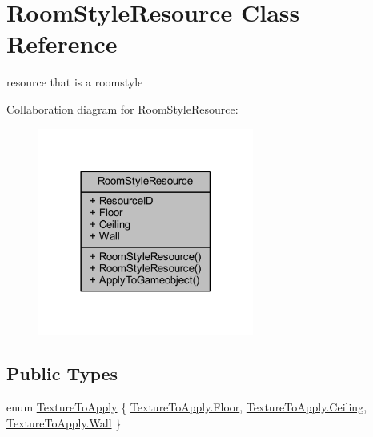 \hypertarget{class_room_style_resource}{}\section{Room\+Style\+Resource Class Reference}
\label{class_room_style_resource}


resource that is a roomstyle  




Collaboration diagram for Room\+Style\+Resource\+:
\nopagebreak
\begin{figure}[H]
\begin{center}
\leavevmode
\includegraphics[width=201pt]{class_room_style_resource__coll__graph}
\end{center}
\end{figure}
\subsection*{Public Types}
\begin{DoxyCompactItemize}
\item 
enum \mbox{\hyperlink{class_room_style_resource_a877062d3830671f8376cc30340cdb45f}{Texture\+To\+Apply}} \{ \mbox{\hyperlink{class_room_style_resource_a877062d3830671f8376cc30340cdb45faf3f6d0343d56ce88ce7958170ed05cb3}{Texture\+To\+Apply.\+Floor}}, 
\mbox{\hyperlink{class_room_style_resource_a877062d3830671f8376cc30340cdb45fa3237fbc8204064c106cb9080088a17cb}{Texture\+To\+Apply.\+Ceiling}}, 
\mbox{\hyperlink{class_room_style_resource_a877062d3830671f8376cc30340cdb45fa94e8a499539d1a472f3b5dbbb85508c0}{Texture\+To\+Apply.\+Wall}}
 \}
\end{DoxyCompactItemize}
